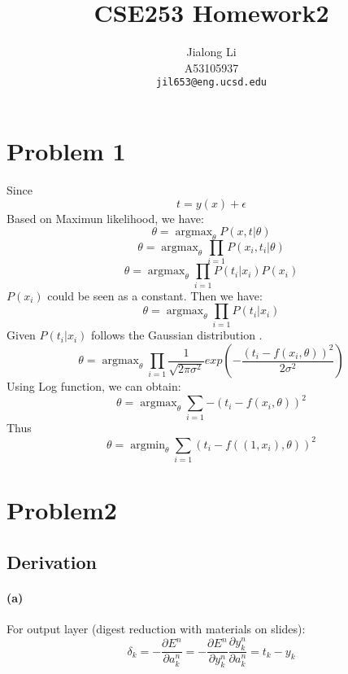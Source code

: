\documentclass{article} %
\title{CSE253 Homework2}
\author{
Jialong Li\\
A53105937\\
\texttt{jil653@eng.ucsd.edu} 
}
\DeclareMathOperator*{\argmax}{argmax}
\DeclareMathOperator*{\argmin}{argmin}
\begin{document}
\section{Problem 1}
Since
\begin{equation*} 
t = y(x) + \epsilon
\end{equation*}
Based on Maximun likelihood, we have:\\
\begin{equation*}
 \theta = \argmax_{\theta}{P(x, t | \theta)}  
\end{equation*}
\begin{equation*}
 \theta = \argmax_{\theta}{\prod_{i=1} {P(x_i, t_i | \theta)}}
\end{equation*}
\begin{equation*}
 \theta = \argmax_{\theta}{\prod_{i=1} {P( t_i | x_i) P(x_i)}}
\end{equation*}
$P(x_i)$ could be seen as a constant.
Then we have:
\begin{equation*}
 \theta = \argmax_{\theta}{\prod_{i=1} {P( t_i | x_i)}}
\end{equation*}
Given $P( t_i | x_i)$ follows the Gaussian distribution .\\
\begin{equation*}
 \theta = \argmax_{\theta}{\prod_{i=1} {\frac{1}{\sqrt{2\pi\sigma^2}}exp(- \frac{(t_i - f(x_i, \theta))^2}{2\sigma^2})}}
\end{equation*}
Using Log function, we can obtain:\\
\begin{equation*}
 \theta = \argmax_{\theta}{\sum_{i=1} {-(t_i - f(x_i, \theta))^2}}
\end{equation*}
Thus\\
\begin{equation*}
 \theta = \argmin_{\theta}{\sum_{i=1} {(t_i - f((1, x_i), \theta))^2}}
\end{equation*}


\section{Problem2}
	\subsection{Derivation}
		\paragraph{(a)}
		For output layer (digest reduction with materials on slides):
		\begin{equation*}
 		\delta_k = - \frac{\partial E^n}{\partial a_k^n} = -\frac{\partial E^n}{\partial y_k^n}\frac{\partial y_k^n}{\partial a_k^n}=t_k-y_k
		\end{equation*}
\end{document}
